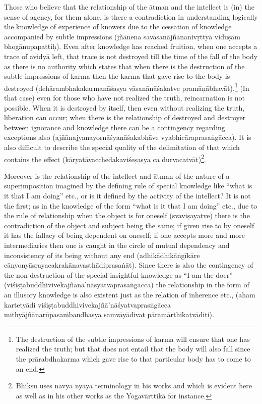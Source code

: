 Those who believe that the relationship of the ātman and the intellect is (in) the sense of agency, for them alone, is there a contradiction in understanding logically the knowledge of experience of knowers due to the cessation of knowledge accompanied by subtle impressions (jñānena savāsanājñānanivṛttyā viduṣām bhogānupapattiḥ). Even after knowledge has reached fruition, when one accepts a trace of avidyā left, that trace is not destroyed till the time of the fall of the body as there is no authority which states that when there is the destruction of the subtle impressions of karma then the karma that gave rise to the body is destroyed (dehārambhakakarmanāśasya vāsanānāśakatve pramāṇābhavāt).\footnote{The destruction of the subtle impressions of karma will ensure that one has realized the truth; but that does not entail that the body will also fall since the prārabdhakarma which gave rise to that particular body has to come to an end.} (In that case) even for those who have not realized the truth, reincarnation is not possible. When it is destroyed by itself, then even without realizing the truth, liberation can occur; when there is the relationship of destroyed and destroyer between ignorance and knowledge there can be a contingency regarding exceptions also (ajñānajyanayornāśyanāśakabhāve vyabhicāraprasaṅgācca). It is also difficult to describe the special quality of the delimitation of that which contains the effect (kāryatāvacchedakaviśeṣasya ca durvacat\-vāt)\footnote{Bhikṣu uses navya nyāya terminology in his works and which is evident here as well as in his other works as the Yogavārttikā for instance.}. 

Moreover is the relationship of the intellect and ātman of the nature of a superimposition imagined by the defining rule of special knowledge like “what is it that I am doing” etc., or is it defined by the activity of the intellect? It is not the first; as in the knowledge of the form “what is it that I am doing” etc., due to the rule of relationship when the object is for oneself (svaviṣayatve) there is the contradiction of the object and subject being the same; if given rise to by oneself it has the fallacy of being dependent on oneself; if one accepts more and more intermediaries then one is caught in the circle of mutual dependency and inconsistency of its being without any end (adhikādhikāṅgīkāre cānyonyāsrayacakrakānavasthādiprasaṅāt). Since there is also the contingency of the non-destruction of the special insightful knowledge as “I am the doer” (viśiṣṭabuddhivivekajñanā’nāsyatvaprasaṅgācca) the relationship in the form of an illusory knowledge is also existent just as the relation of inherence etc., (aham kartetyādi viśiṣṭabuddhivivekajñā’nāśyatvaprasṅgācca mithyājñānarūpasaṁbandhasya samvāyādivat pāramārthikatvāditi).

